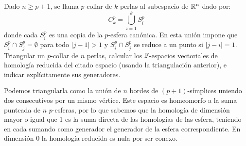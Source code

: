 \documentclass[twoside]{article}
\begin{document}
\begin{ejercicio}{2}
Dado $n\geq p+1$, se llama $p$-collar de $k$ perlas al subespacio de $\mathbb{R}^n$ dado por: 
\[
C_k^p=\bigcup_{i=1}^k S_i^p
\]
donde cada $S_i^p$ es una copia de la $p$-esfera canónica. En esta unión impone que $S_i^p\cap S_j^p=\emptyset$ para todo $|j-1|>1$ y $S_i^p\cap S_j^p$ se reduce a un punto si $|j-i|=1$. Triangular un $p$-collar de $n$ perlas, calcular los $\mathbb{F}$-espacios vectoriales de homología reducida del citado espacio (usando la triangulación anterior), e indicar explícitamente sus generadores.
\end{ejercicio}
\begin{solucion}
Podemos triangularla como la unión de $n$ bordes de $(p+1)$-símplices uniendo dos consecutivos por un mismo vértice. Este espacio es homeomorfo a la suma punteada de $n$ $p$-esferas, por lo que sabemos que la homología de dimensión mayor o igual que 1 es la suma directa de las homologías de las esfera, teniendo en cada sumando como generador el generador de la esfera correspondiente. En dimensión 0 la homología reducida es nula por ser conexo. 
\end{solucion}


\newpage
\end{document}
